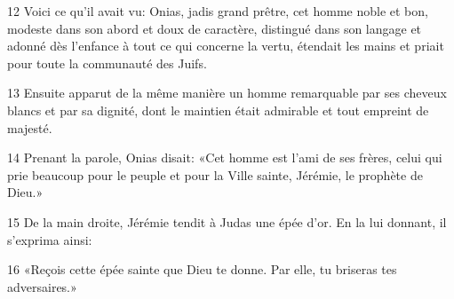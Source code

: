 
12 Voici ce qu’il avait vu: Onias, jadis grand prêtre, cet homme noble et bon, modeste dans son abord et doux de caractère, distingué dans son langage et adonné dès l’enfance à tout ce qui concerne la vertu, étendait les mains et priait pour toute la communauté des Juifs.

13 Ensuite apparut de la même manière un homme remarquable par ses cheveux blancs et par sa dignité, dont le maintien était admirable et tout empreint de majesté.

14 Prenant la parole, Onias disait: «Cet homme est l’ami de ses frères, celui qui prie beaucoup pour le peuple et pour la Ville sainte, Jérémie, le prophète de Dieu.»

15 De la main droite, Jérémie tendit à Judas une épée d’or. En la lui donnant, il s’exprima ainsi:

16 «Reçois cette épée sainte que Dieu te donne. Par elle, tu briseras tes adversaires.»
